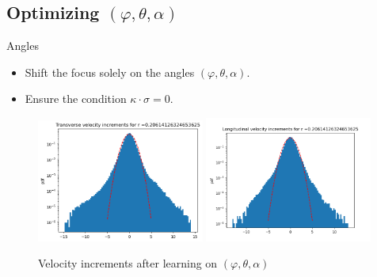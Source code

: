 \documentclass[11pt]{beamer}
\begin{document}

\subsection{Optimizing $(\varphi,\theta,\alpha)$}
\begin{frame}{Angles}
  \begin{itemize}
    \item Shift the focus solely on the angles $(\varphi,\theta,\alpha)$.
    \item Ensure the condition $\kappa\cdot\sigma=0$.
  \end{itemize}
  \begin{figure}
    \centering
    \includegraphics[width=0.49\textwidth]{illustrations/TransVelIncrAngles.png}
    \includegraphics[width=0.49\textwidth]{illustrations/LongVelIncrAngles.png}
    \caption{Velocity increments after learning on $(\varphi,\theta,\alpha)$}
  \end{figure}
\end{frame}
\end{document}
